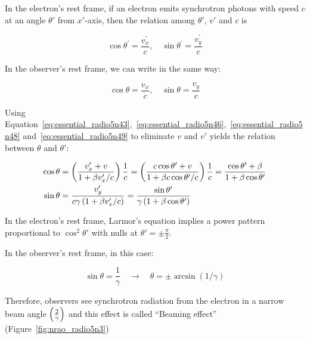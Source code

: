 In the electron's rest frame, if an electron emits synchrotron photons with speed $c$ at an angle $\theta'$ from $x'$-axis, then the relation among $\theta'$, $v'$ and $c$ is

\begin{equation}\label{eq:essential_radio5n48}
    \cos \theta^{\prime}=\frac{v_x^{\prime}}{c}, \quad \sin \theta^{\prime}=\frac{v_y^{\prime}}{c}
\end{equation}

In the observer's rest frame, we can write in the same way:

\begin{equation}\label{eq:essential_radio5n49}
    \cos \theta=\frac{v_x}{c}, \quad \sin \theta=\frac{v_y}{c}
\end{equation}

Using Equation~\ref{eq:essential_radio5n43},~\ref{eq:essential_radio5n46},~\ref{eq:essential_radio5n48} and~\ref{eq:essential_radio5n49} to eliminate $v$ and $v'$ yields the relation between $\theta$ and $\theta'$:

\begin{equation}\label{eq:essential_radio5n50}
    \begin{aligned}
        \cos \theta &= \left(\frac{v_x^{\prime}+v}{1+\beta v_x^{\prime} / c}\right) \frac{1}{c}=\left(\frac{c \cos \theta^{\prime}+v}{1+\beta c \cos \theta^{\prime} / c}\right) \frac{1}{c}=\frac{\cos \theta^{\prime}+\beta}{1+\beta \cos \theta^{\prime}} \\
        \sin \theta &= \frac{v_y^{\prime}}{c \gamma\left(1+\beta v_{x}^{\prime} / c\right)} = \frac{\sin \theta^{\prime}}{\gamma\left(1+\beta \cos \theta^{\prime}\right)}
    \end{aligned}
\end{equation}

In the electron's rest frame, Larmor's equation implies a power pattern proportional to $\cos^2\theta'$ with nulls at $\theta'=\pm \frac{\pi}{2}$.

In the observer's rest frame, in this case:

\begin{equation}\label{eq:essential_radio5n52}
    \sin\theta = \frac{1}{\gamma} \quad \rightarrow \quad \theta=\pm \arcsin (1 / \gamma)
\end{equation}

Therefore, observers see synchrotron radiation from the electron in a narrow beam angle $\left(\frac{2}{\gamma}\right)$ and this effect is called ``Beaming effect'' (Figure~\ref{fig:nrao_radio5n3})

